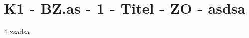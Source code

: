 \section{K1 - BZ.as - 1 - Titel - ZO - asdsa}

\begin{langesbeispiel}\item[4] %
xsadsa

\end{langesbeispiel}